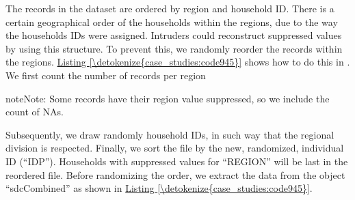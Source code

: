 \documentclass[letterpaper,10pt,english]{sphinxmanual}
\begin{document}

The records in the dataset are ordered by region and household ID. There
is a certain geographical order of the households within the regions,
due to the way the households IDs were assigned. Intruders could
reconstruct suppressed values by using this structure. To prevent this,
we randomly reorder the records within the regions. \hyperref[\detokenize{case_studies:code945}]{Listing \ref{\detokenize{case_studies:code945}}} shows
how to do this in . We first count the number of records per region

\begin{sphinxadmonition}{note}{Note:}
Some records have their region value suppressed, so we include the count of NAs.
\end{sphinxadmonition}

Subsequently, we draw randomly household IDs, in
such way that the regional division is respected. Finally, we sort the
file by the new, randomized, individual ID (“IDP”). Households with
suppressed values for “REGION” will be last in the reordered file.
Before randomizing the order, we extract the data from the 
object “sdcCombined” as shown in \hyperref[\detokenize{case_studies:code945}]{Listing \ref{\detokenize{case_studies:code945}}}.
\end{document}
